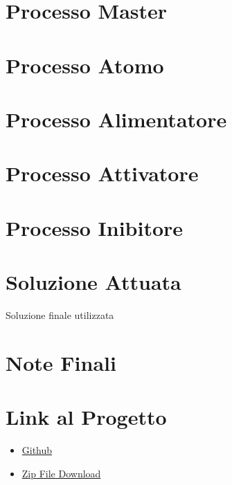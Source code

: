 \documentclass{article}
\begin{document}
\section{Processo Master}

\section{Processo Atomo}

\section{Processo Alimentatore}

\section{Processo Attivatore}

\section{Processo Inibitore}


\section{Soluzione Attuata}
Soluzione finale utilizzata

\section{Note Finali}


\section{Link al Progetto}
    \begin{itemize}
        \item \href{https://github.com/filippo-ferrando/progetto-so}{Github}
        \item \href{https://github.com/filippo-ferrando/progetto-so/archive/refs/heads/main.zip}{Zip File Download}
    \end{itemize}
\end{document}

